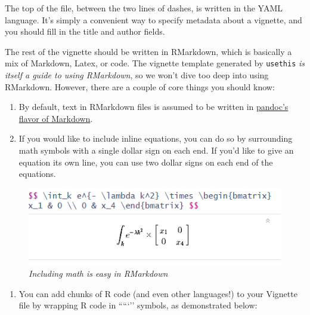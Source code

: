 \documentclass[
]{book}
\providecommand{\tightlist}{%
  \setlength{\itemsep}{0pt}\setlength{\parskip}{0pt}}
\begin{document}
The top of the file, between the two lines of dashes, is written in the YAML language. It's simply a convenient way to specify metadata about a vignette, and you should fill in the title and author fields.

The rest of the vignette should be written in RMarkdown, which is basically a mix of Markdown, Latex, or code. The vignette template generated by \texttt{usethis} \emph{is itself a guide to using RMarkdown}, so we won't dive too deep into using RMarkdown. However, there are a couple of core things you should know:

\begin{enumerate}
\def\labelenumi{\arabic{enumi}.}
\item
  By default, text in RMarkdown files is assumed to be written in \href{http://pandoc.org/MANUAL.html}{pandoc's flavor of Markdown}.
\item
  If you would like to include inline equations, you can do so by surrounding math symbols with a single dollar sign on each end. If you'd like to give an equation its own line, you can use two dollar signs on each end of the equations.
\end{enumerate}

\begin{figure}
\centering
\includegraphics{images/packageSS/vignettemath.PNG}
\caption{\emph{Including math is easy in RMarkdown}}
\end{figure}

\begin{enumerate}
\def\labelenumi{\arabic{enumi}.}
\setcounter{enumi}{2}
\tightlist
\item
  You can add chunks of R code (and even other languages!) to your Vignette file by wrapping R code in `````'' symbols, as demonstrated below:
\end{enumerate}
\end{document}

